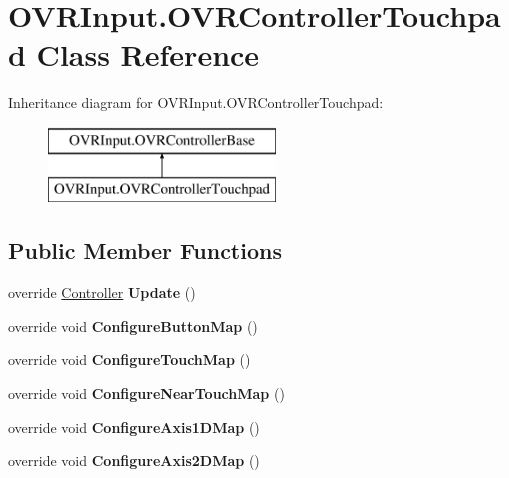\hypertarget{class_o_v_r_input_1_1_o_v_r_controller_touchpad}{}\section{O\+V\+R\+Input.\+O\+V\+R\+Controller\+Touchpad Class Reference}
\label{class_o_v_r_input_1_1_o_v_r_controller_touchpad}
Inheritance diagram for O\+V\+R\+Input.\+O\+V\+R\+Controller\+Touchpad\+:\begin{figure}[H]
\begin{center}
\leavevmode
\includegraphics[height=2.000000cm]{class_o_v_r_input_1_1_o_v_r_controller_touchpad}
\end{center}
\end{figure}
\subsection*{Public Member Functions}
\begin{DoxyCompactItemize}
\item 
\mbox{\label{class_o_v_r_input_1_1_o_v_r_controller_touchpad_a27e4a3a9bc20203337f1b51d930ca11c}} 
override \mbox{\hyperlink{class_o_v_r_input_a5c86f9052a9cbb0b73779ff5704d60a8}{Controller}} {\bfseries Update} ()
\item 
\mbox{\label{class_o_v_r_input_1_1_o_v_r_controller_touchpad_acc582d2503231d473d60008eed0877ab}} 
override void {\bfseries Configure\+Button\+Map} ()
\item 
\mbox{\label{class_o_v_r_input_1_1_o_v_r_controller_touchpad_ad756010b0e01245b76a145c3a65b77b1}} 
override void {\bfseries Configure\+Touch\+Map} ()
\item 
\mbox{\label{class_o_v_r_input_1_1_o_v_r_controller_touchpad_a0e57190bc43c2b33eb4dcc0bd84fc4fa}} 
override void {\bfseries Configure\+Near\+Touch\+Map} ()
\item 
\mbox{\label{class_o_v_r_input_1_1_o_v_r_controller_touchpad_ae3281abd56ab97cf6ab78b0f08100403}} 
override void {\bfseries Configure\+Axis1\+D\+Map} ()
\item 
\mbox{\label{class_o_v_r_input_1_1_o_v_r_controller_touchpad_a51162111589d04ae95c253f42c90e7f2}} 
override void {\bfseries Configure\+Axis2\+D\+Map} ()
\end{DoxyCompactItemize}
